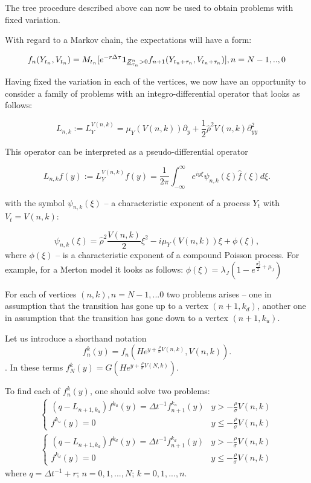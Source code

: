 \documentclass[a4paper]{jpconf}
\begin{document}
The tree procedure described above can now be used to obtain problems with fixed variation.

With regard to a Markov chain, the expectations will have a form:

$$
f_{n}({Y}_{t_n}, {V}_{t_n}) = M_{t_{n}} [ e^{-r\Delta \tau}  
{\bf 1}_{\underline{Z}^n_{\tau_n} > 0} f_{n+1}(Y_{t_n+\tau_n},V_{t_n+\tau_n})], \smallskip\\ n = N-1,..,0 
$$

Having fixed the variation in each of the vertices, we now have an opportunity to consider a family of problems with an integro-differential operator that looks as follows:

$$L_{n,k} := L_{Y}^{V(n,k)} = \mu_{Y}(V(n,k)) \partial_{y} + \frac{1}{2}\hat{\rho}^2 V(n,k)\partial^2_{yy}$$

This operator can be interpreted as a pseudo-differential operator 

$$L_{n,k}f(y) := L_{Y}^{V(n,k)}f(y) = \frac{1}{2\pi}\int^\infty_{-\infty}e^{iy\xi}\psi_{n,k}(\xi)\hat{f}(\xi)d\xi.$$

with the symbol $\psi_{n,k}(\xi)$ -- a characteristic exponent of a process $Y_t$ with $V_t = V(n,k)$:

\begin{equation*}
\psi_{n,k}(\xi) = \hat{\rho}^2\frac{V(n,k)}{2}\xi^2 - i\mu_Y(V(n,k))\xi + \phi(\xi),
\end{equation*}
where $\phi(\xi)$ -- is a characteristic exponent of a compound Poisson process. For example, for a Merton model it looks as follows: $\phi(\xi) = \lambda_J(1-e^{\frac{\sigma_J^2}{2} + \mu_J})$

For each of vertices $(n,k), n=N-1,...0$ two problems arises -- one in assumption that the transition has gone up to a vertex $(n+1,k_d)$, another one in assumption that the transition has gone down to a vertex $(n+1,k_u)$. 

Let us introduce a shorthand notation 
$$f_{n}^{k}(y) = f_n(He^{y+\frac{\rho}{\sigma}V(n,k)},V(n,k)).$$.
In these terms $f_{N}^{k}(y) = G(He^{y+\frac{\rho}{\sigma}V(N,k)})$.

To find each of $f_{n}^{k}(y)$, one should solve two problems:
\begin{gather}
	\begin{cases}
	(q - L_{n+1,k_{u}})f^{k_{u}}(y) = {\Delta t}^{-1} f^{k_u}_{n+1}(y) & y > - \frac{\rho}{\sigma}V(n,k) \\
	f^{k_{u}}(y) = 0 & y \le - \frac{\rho}{\sigma}V(n,k)
	\end{cases}
	\end{gather}
\begin{gather}
	\begin{cases}
	(q - L_{n+1,k_{d}})f^{k_{d}}(y) = {\Delta t}^{-1} f^{k_d}_{n+1}(y) & y > - \frac{\rho}{\sigma}V(n,k) \\
	f^{k_{d}}(y) = 0 & y \le - \frac{\rho}{\sigma}V(n,k)
	\end{cases}
	\end{gather}
where $q = {\Delta t}^{-1} + r$; $n = 0,1,...,N$; $k = 0,1,...,n$.
\end{document}
